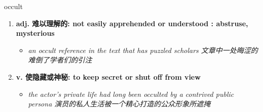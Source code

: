 
\begin{frame}
{\huge occult}
\begin{center}
\begin{enumerate}\Large
  \item \textbf{adj. 难以理解的: not easily apprehended or understood : abstruse, mysterious}
  \begin{itemize}
    \item \em{\Large{an occult reference in the text that has puzzled scholars 文章中一处晦涩的难倒了学者们的引注}}
  \end{itemize}
  \item \textbf{v. 使隐藏或神秘: to keep secret or shut off from view}
  \begin{itemize}
    \item \em{\Large{the actor's private life had long been occulted by a contrived public persona 演员的私人生活被一个精心打造的公众形象所遮掩}}
  \end{itemize}
\end{enumerate}
\end{center}
\end{frame}
